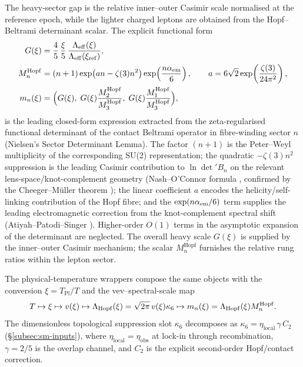 \documentclass[11pt]{amsart}
\begin{document}
The heavy-sector gap is the relative inner--outer Casimir scale normalised at the reference epoch, while the lighter charged leptons are obtained from the Hopf--Beltrami determinant scalar. The explicit functional form
\begin{align}
  G(\xi) &=
    \frac{4}{5}\,\frac{\xi}{5}\,
    \frac{\Lambda_{\rm eff}(\xi)}
         {\Lambda_{\rm eff}(\xi_{\rm ref})}, \\
  M_n^{\mathrm{Hopf}} &= (n+1)\exp\!\left(a n-\zeta(3)n^2\right)
    \exp\!\left(\frac{n\alpha_{\rm em}}{6}\right),\qquad
    a=6\sqrt2\exp\!\left(\frac{\zeta(3)}{24\pi^2}\right), \\
  m_n(\xi) &=
    \Bigl(G(\xi),\;G(\xi)\frac{M_2^{\mathrm{Hopf}}}{M_3^{\mathrm{Hopf}}},\;
           G(\xi)\frac{M_1^{\mathrm{Hopf}}}{M_3^{\mathrm{Hopf}}}\Bigr),
\end{align}
is the leading closed-form expression extracted from the zeta-regularised functional determinant of the contact Beltrami operator in fibre-winding sector $n$ (Nielsen's Sector Determinant Lemma). The factor $(n+1)$ is the Peter--Weyl multiplicity of the corresponding SU(2) representation; the quadratic $-\zeta(3)n^2$ suppression is the leading Casimir contribution to $\ln\det'B_n$ on the relevant lens-space/knot-complement geometry (Nash--O'Connor formula \cite{NashOConnor}, confirmed by the Cheeger--Müller theorem \cite{Cheeger1979,Muller1978,RaySinger1971}); the linear coefficient $a$ encodes the helicity/self-linking contribution of the Hopf fibre; and the $\exp(n\alpha_{\rm em}/6)$ term supplies the leading electromagnetic correction from the knot-complement spectral shift (Atiyah--Patodi--Singer \cite{APS1975}). Higher-order $O(1)$ terms in the asymptotic expansion of the determinant are neglected. The overall heavy scale $G(\xi)$ is supplied by the inner--outer Casimir mechanism; the scalar $M_n^{\mathrm{Hopf}}$ furnishes the relative rung ratios within the lepton sector.

The physical-temperature wrappers compose the same objects with the conversion $\xi=T_{\mathrm{Pl}}/T$ and the vev--spectral-scale map
\[
T\mapsto \xi\mapsto v(\xi)
\mapsto \Lambda_{\rm Hopf}(\xi)=\sqrt{2\pi}\,v(\xi)\kappa_6
\mapsto m_n(\xi)=\Lambda_{\rm Hopf}(\xi)M_n^{\mathrm{Hopf}}.
\]
The dimensionless topological suppression slot $\kappa_6$ decomposes as $\kappa_6=\eta_{\mathrm{local}}\,\gamma\,C_2$ (§\ref{subsec:sm-inputs}), where $\eta_{\mathrm{local}}=\eta_{\mathrm{obs}}$ at lock-in through recombination, $\gamma=2/5$ is the overlap channel, and $C_2$ is the explicit second-order Hopf/contact correction.
\end{document}
